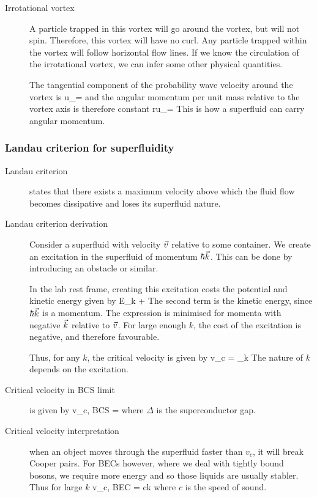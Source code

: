 \begin{description}
 
\item[Irrotational vortex] A particle trapped in this vortex will go around the vortex, but will not spin. Therefore, this vortex will have no curl. Any particle trapped within the vortex will follow horizontal flow lines. If we know the circulation of the irrotational vortex, we can infer some other physical quantities. 

The tangential component of the probability wave velocity around the vortex is
\beq
u_\theta = \frac{\Gamma}{2\pi}
\eeq
and the angular momentum per unit mass relative to the vortex axis is therefore constant
\beq
ru_\theta = \frac{\Gamma}{2\pi}
\eeq
This is how a superfluid can carry angular momentum. 

\end{description}
\subsubsection{Landau criterion for superfluidity}
\begin{description}

\item[Landau criterion] states that there exists a maximum velocity above which the fluid flow becomes dissipative and loses its superfluid nature. 

\item[Landau criterion derivation] Consider a superfluid with velocity $\vec{v}$ relative to some container. We create an excitation in the superfluid of momentum $\hbar \vec{k}$. This can be done by introducing an obstacle or similar. 

In the lab rest frame, creating this excitation costs the potential and kinetic energy given by 
\beq
E_k + \hbar {} \cdot {}
\eeq
The second term is the kinetic energy, since $\hbar \vec{k}$ is a momentum. The expression is minimised for momenta with negative $\vec{k}$ relative to $\vec{v}$. For large enough $k$, the cost of the excitation is negative, and therefore favourable. 

Thus, for any $k$, the critical velocity is given by 
\beq
v_c = \min_{k} 
\eeq
The nature of $k$ depends on the excitation. 

\item[Critical velocity in BCS limit] is given by
\beq
v_{c, BCS} = 
\eeq
where $\Delta$ is the superconductor gap. 

\item[Critical velocity interpretation] when an object moves through the superfluid faster than $v_c$, it will break Cooper pairs. For BECs however, where we deal with tightly bound bosons, we require more energy and so those liquids are usually stabler. Thus for large $k$
\beq
v_{c, BEC} = ck
\eeq
where $c$ is the speed of sound. 

\end{description}
